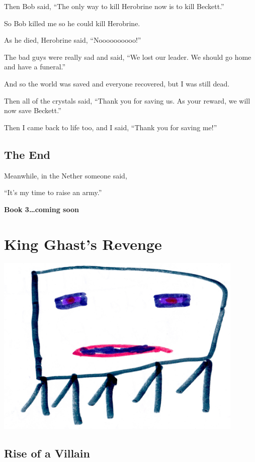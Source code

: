 \documentclass[letterpaper, oneside, 12pt]{krantz}
\begin{document}
Then Bob said, ``The only way to kill Herobrine now is to kill
Beckett.''

So Bob killed me so he could kill Herobrine.

As he died, Herobrine said, ``Noooooooooo!''

The bad guys were really sad and said, ``We lost our leader. We should
go home and have a funeral.''

And so the world was saved and everyone recovered, but I was still dead.

Then all of the crystals said, ``Thank you for saving us. As your
reward, we will now save Beckett.''

Then I came back to life too, and I said, ``Thank you for saving me!''

\hypertarget{the-end}{%
\section*{The End}\label{the-end}}


Meanwhile, in the Nether someone said,

``It's my time to raise an army.''

\textbf{Book 3\ldots{}coming soon}

\hypertarget{king-ghasts-revenge}{%
\chapter{King Ghast's Revenge}\label{king-ghasts-revenge}}

\includegraphics[width=4.6875in,height=\textheight]{img/king-ghast/00-ghast.jpg}

\clearpage

\hypertarget{rise-of-a-villain}{%
\section{Rise of a Villain}\label{rise-of-a-villain}}
\end{document}
